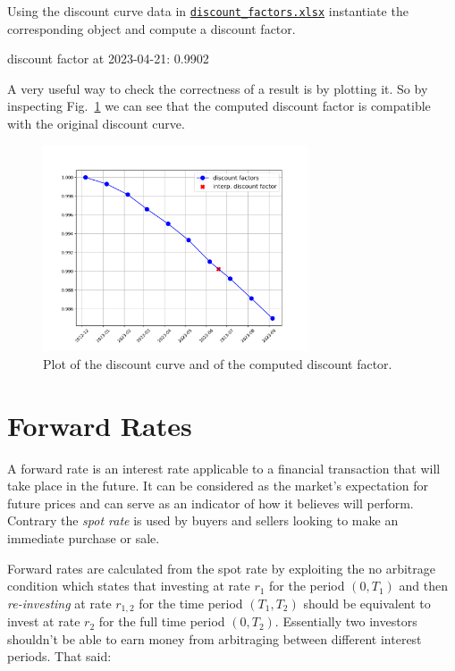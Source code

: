 
Using the discount curve data in \href{https://github.com/matteosan1/finance_course/raw/master/input_files/discount_factors_2022-10-05.xlsx}{\texttt{discount\_factors.xlsx}} instantiate the corresponding object and compute a discount factor.


\begin{ioutput}
discount factor at 2023-04-21: 0.9902
\end{ioutput}

A very useful way to check the correctness of a result is by plotting it. So by inspecting Fig.~\ref{fig:linear_discount_curve} we can see that the computed discount factor is compatible with the original discount curve.

\begin{figure}[htb]
	\centering
	\includegraphics[width=0.7\textwidth]{figures/linear_discount_curve}
	\caption{Plot of the discount curve and of the computed discount factor.}
	\label{fig:linear_discount_curve}
\end{figure}

\section{Forward Rates}
\label{calculating-forward-rates}
A forward rate is an interest rate applicable to a financial transaction that will take place in the future. It can be considered as the market's expectation for future prices and can serve as an indicator of how it believes will perform. Contrary the \emph{spot rate} is used by buyers and sellers looking to make an immediate purchase or sale.

Forward rates are calculated from the spot rate by exploiting the no arbitrage condition which states that investing at rate $r_1$ for the period $(0, T_1)$ and then \emph{re-investing} at rate $r_{1,2}$ for the time period $(T_1, T_2)$ should be equivalent to invest at rate $r_2$ for the full time period $(0, T_2)$. Essentially two investors shouldn't be able to earn money from arbitraging between different interest periods. That said:

